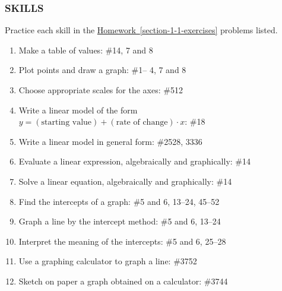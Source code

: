 \documentclass[10pt,]{book}
\theoremstyle{plain}
\theoremstyle{definition}
\theoremstyle{definition}
\theoremstyle{definition}
\numberwithin{equation}{part}
\begin{document}
\subsubsection[{SKILLS}]{SKILLS}\label{subsubsection-4}
Practice each skill in the \hyperref[section-1-1-exercises]{Homework~\ref{section-1-1-exercises}} problems listed. \leavevmode%
\begin{enumerate}[label=\arabic*]
\item\hypertarget{li-103}{}Make a table of values: \#1\textendash{}4, 7 and 8%
\item\hypertarget{li-104}{}Plot points and draw a graph: \#1– 4, 7 and 8%
\item\hypertarget{li-105}{}Choose appropriate scales for the axes: \#5\textendash{}12%
\item\hypertarget{li-106}{}Write a linear model of the form \(y = (\text{starting value}) + (\text{rate of change})\cdot x\): \#1\textendash{}8%
\item\hypertarget{li-107}{}Write a linear model in general form: \#25\textendash{}28, 33\textendash{}36%
\item\hypertarget{li-108}{}Evaluate a linear expression, algebraically and graphically: \#1\textendash{}4%
\item\hypertarget{li-109}{}Solve a linear equation, algebraically and graphically: \#1\textendash{}4%
\item\hypertarget{li-110}{}Find the intercepts of a graph: \#5 and 6, 13–24, 45–52%
\item\hypertarget{li-111}{}Graph a line by the intercept method: \#5 and 6, 13–24%
\item\hypertarget{li-112}{}Interpret the meaning of the intercepts: \#5 and 6, 25–28%
\item\hypertarget{li-113}{}Use a graphing calculator to graph a line: \#37\textendash{}52%
\item\hypertarget{li-114}{}Sketch on paper a graph obtained on a calculator: \#37\textendash{}44%
\end{enumerate}
%
\typeout{************************************************}
\typeout{************************************************}
\end{document}
